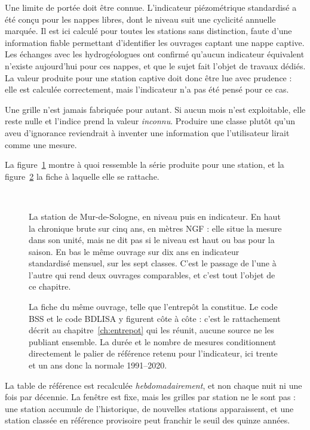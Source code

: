 Une limite de portée doit être connue. L'indicateur piézométrique standardisé a été conçu pour
les nappes libres, dont le niveau suit une cyclicité annuelle marquée. Il est ici
calculé pour toutes les stations sans distinction, faute d'une information fiable permettant
d'identifier les ouvrages captant une nappe captive. Les échanges avec les hydrogéologues ont
confirmé qu'aucun indicateur équivalent n'existe aujourd'hui pour ces nappes, et que le sujet
fait l'objet de travaux dédiés. La valeur produite pour une station captive doit donc être lue
avec prudence : elle est calculée correctement, mais l'indicateur n'a pas été pensé pour ce cas.

Une grille n'est jamais fabriquée pour autant. Si aucun mois n'est exploitable, elle reste
nulle et l'indice prend la valeur \emph{inconnu}. Produire une classe plutôt qu'un aveu
d'ignorance reviendrait à inventer une information que l'utilisateur lirait comme une mesure.

La figure~\ref{fig:ips-serie} montre à quoi ressemble la série produite pour une station, et
la figure~\ref{fig:ips-station} la fiche à laquelle elle se rattache.

\begin{figure}[htbp]
\centering
{}\\[0.35em]
\caption{La station de Mur-de-Sologne, en niveau puis en indicateur. En haut la chronique brute
sur cinq ans, en mètres NGF : elle situe la mesure dans son unité, mais ne dit pas si le niveau
est haut ou bas pour la saison. En bas le même ouvrage sur dix ans en indicateur standardisé
mensuel, sur les sept classes. C'est le passage de l'une à l'autre qui rend deux ouvrages
comparables, et c'est tout l'objet de ce chapitre.}
\label{fig:ips-serie}
\end{figure}

\begin{figure}[htbp]
\centering
{}
\caption{La fiche du même ouvrage, telle que l'entrepôt la constitue. Le code BSS et le code
BDLISA y figurent côte à côte : c'est le rattachement décrit au chapitre~\ref{ch:entrepot} qui les
réunit, aucune source ne les publiant ensemble. La durée et le nombre de mesures conditionnent
directement le palier de référence retenu pour l'indicateur, ici trente et un ans donc la normale
1991--2020.}
\label{fig:ips-station}
\end{figure}

La table de référence est recalculée \emph{hebdomadairement}, et non chaque nuit ni une fois par
décennie. La fenêtre est fixe, mais les grilles par station ne le sont pas : une station
accumule de l'historique, de nouvelles stations apparaissent, et une station classée en
référence provisoire peut franchir le seuil des quinze années.

